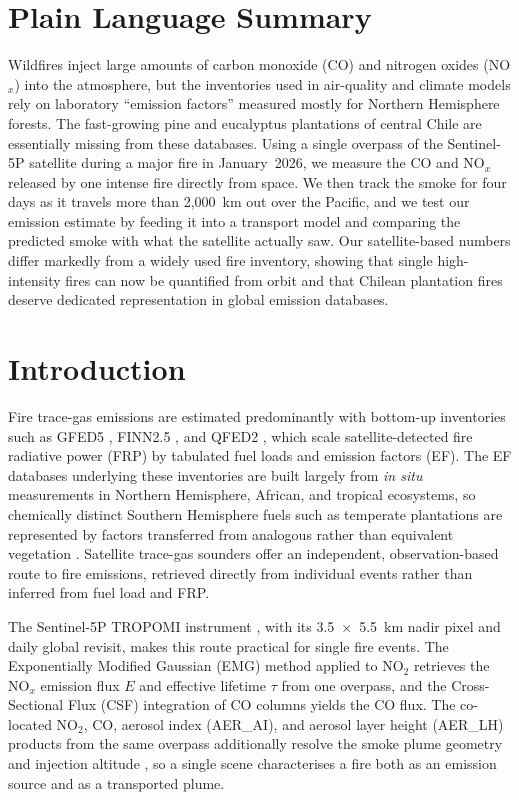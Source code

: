 \documentclass[draft]{agujournal2019}
\newcommand{\NOx}{NO$_x$}
\newcommand{\NOtwo}{NO$_2$}
\begin{document}
\section*{Plain Language Summary}
Wildfires inject large amounts of carbon monoxide (CO) and nitrogen oxides (\NOx{}) into the atmosphere, but the inventories used in air-quality and climate models rely on laboratory ``emission factors'' measured mostly for Northern Hemisphere forests. The fast-growing pine and eucalyptus plantations of central Chile are essentially missing from these databases. Using a single overpass of the Sentinel-5P satellite during a major fire in January~2026, we measure the CO and \NOx{} released by one intense fire directly from space. We then track the smoke for four days as it travels more than 2{,}000~km out over the Pacific, and we test our emission estimate by feeding it into a transport model and comparing the predicted smoke with what the satellite actually saw. Our satellite-based numbers differ markedly from a widely used fire inventory, showing that single high-intensity fires can now be quantified from orbit and that Chilean plantation fires deserve dedicated representation in global emission databases.

\section{Introduction}
\label{sec:intro}

Fire trace-gas emissions are estimated predominantly with bottom-up inventories such as GFED5 \citep{vanderWerf2017}, FINN2.5 \citep{Wiedinmyer2023}, and QFED2 \citep{Darmenov2015}, which scale satellite-detected fire radiative power (FRP) by tabulated fuel loads and emission factors (EF). The EF databases underlying these inventories \citep{Akagi2011, Andreae2019, Urbanski2014} are built largely from \textit{in situ} measurements in Northern Hemisphere, African, and tropical ecosystems, so chemically distinct Southern Hemisphere fuels such as temperate plantations are represented by factors transferred from analogous rather than equivalent vegetation \citep{Weise2022}. Satellite trace-gas sounders offer an independent, observation-based route to fire emissions, retrieved directly from individual events rather than inferred from fuel load and FRP.

The Sentinel-5P TROPOMI instrument \citep{Veefkind2012}, with its 3.5~$\times$~5.5~km nadir pixel and daily global revisit, makes this route practical for single fire events. The Exponentially Modified Gaussian (EMG) method applied to \NOtwo{} \citep{Jin2021} retrieves the \NOx{} emission flux $E$ and effective lifetime $\tau$ from one overpass, and the Cross-Sectional Flux (CSF) integration of CO columns \citep{Griffin2021} yields the CO flux. The co-located \NOtwo{}, CO, aerosol index (AER\_AI), and aerosol layer height (AER\_LH) products from the same overpass additionally resolve the smoke plume geometry and injection altitude \citep{deGraaf2023}, so a single scene characterises a fire both as an emission source and as a transported plume.
\end{document}
